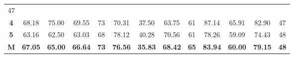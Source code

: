 \begin{table}[H]
{\begin{tabular}{ccccccccccccc}
			\multicolumn{1}{c|}{47} \\ \cline{2-13} 
			\multicolumn{1}{c|}{\cellcolor[HTML]{D9D9D9}\textbf{4}} &
			\multicolumn{1}{c|}{68.18} &
			\multicolumn{1}{c|}{75.00} &
			\multicolumn{1}{c|}{69.55} &
			\multicolumn{1}{c|}{73} &
			\multicolumn{1}{c|}{70.31} &
			\multicolumn{1}{c|}{37.50} &
			\multicolumn{1}{c|}{63.75} &
			\multicolumn{1}{c|}{61} &
			\multicolumn{1}{c|}{87.14} &
			\multicolumn{1}{c|}{65.91} &
			\multicolumn{1}{c|}{82.90} &
			\multicolumn{1}{c|}{47} \\ \cline{2-13} 
			\multicolumn{1}{c|}{\cellcolor[HTML]{D9D9D9}\textbf{5}} &
			\multicolumn{1}{c|}{63.16} &
			\multicolumn{1}{c|}{62.50} &
			\multicolumn{1}{c|}{63.03} &
			\multicolumn{1}{c|}{68} &
			\multicolumn{1}{c|}{78.12} &
			\multicolumn{1}{c|}{40.28} &
			\multicolumn{1}{c|}{70.56} &
			\multicolumn{1}{c|}{61} &
			\multicolumn{1}{c|}{78.26} &
			\multicolumn{1}{c|}{59.09} &
			\multicolumn{1}{c|}{74.43} &
			\multicolumn{1}{c|}{48} \\ \cline{2-13} 
			\multicolumn{1}{c|}{\cellcolor[HTML]{FFFF00}\textbf{M}} &
			\multicolumn{1}{c|}{\textbf{67.05}} &
			\multicolumn{1}{c|}{\textbf{65.00}} &
			\multicolumn{1}{c|}{\textbf{66.64}} &
			\multicolumn{1}{c|}{\textbf{73}} &
			\multicolumn{1}{c|}{\textbf{76.56}} &
			\multicolumn{1}{c|}{\textbf{35.83}} &
			\multicolumn{1}{c|}{\textbf{68.42}} &
			\multicolumn{1}{c|}{\textbf{65}} &
			\multicolumn{1}{c|}{\textbf{83.94}} &
			\multicolumn{1}{c|}{\textbf{60.00}} &
			\multicolumn{1}{c|}{\textbf{79.15}} &
			\multicolumn{1}{c|}{\textbf{48}} \\ \cline{2-13} 
		\end{tabular}%
	}
\end{table}
